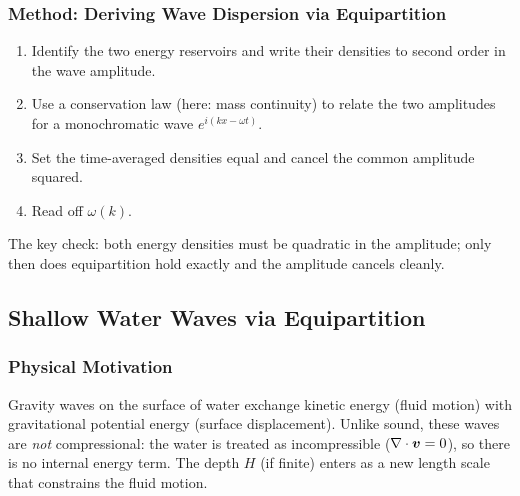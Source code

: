 
\subsubsection*{Method: Deriving Wave Dispersion via Equipartition}
\begin{enumerate}
    \item Identify the two energy reservoirs and write their densities to second
    order in the wave amplitude.
    \item Use a conservation law (here: mass continuity) to relate the two
    amplitudes for a monochromatic wave $e^{i(kx-\omega t)}$.
    \item Set the time-averaged densities equal and cancel the common
    amplitude squared.
    \item Read off $\omega(k)$.
\end{enumerate}
The key check: both energy densities must be quadratic in the amplitude; only
then does equipartition hold exactly and the amplitude cancels cleanly.

\subsection{Shallow Water Waves via Equipartition}
\label{sec:lec10:shallow-water}

\subsubsection*{Physical Motivation}
Gravity waves on the surface of water exchange kinetic energy (fluid motion)
with gravitational potential energy (surface displacement). Unlike sound, these
waves are \emph{not} compressional: the water is treated as incompressible
($\nabla\cdot\vb*{v}=0$), so there is no internal energy term. The depth $H$
(if finite) enters as a new length scale that constrains the fluid motion.

